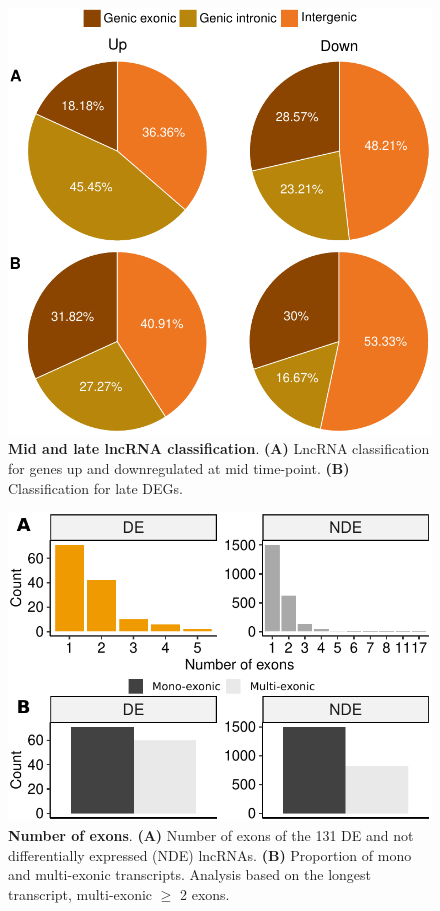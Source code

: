 \begin{figure}[ht!]
  \centering
  \includegraphics[scale=0.5]{plots/appendix/dme/lncRNA.class.mid.late.tp.pdf}
  \caption[Mid and late lncRNA classification]{\textbf{Mid and late lncRNA classification}. \textbf{(A)} LncRNA classification for genes up and downregulated at mid time-point. \textbf{(B)} Classification for late DEGs. }
  \label{supp-fig:mid-late-class}
\end{figure}

\begin{figure}[ht!]
  \centering
  \includegraphics[scale=0.65]{plots/appendix/dme/number.exons.pdf}
  \caption[Number of exons]{\textbf{Number of exons}. \textbf{(A)} Number of exons of the 131 DE and not differentially expressed (NDE) lncRNAs. \textbf{(B)} Proportion of mono and multi-exonic transcripts. Analysis based on the longest transcript, multi-exonic $\ge$ 2 exons.}
  \label{supp-fig:number-exons}
\end{figure}

